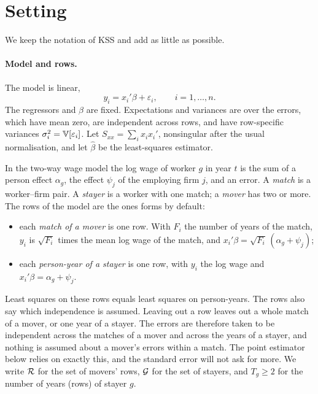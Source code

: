 \section{Setting}\label{sec:setting}

We keep the notation of KSS and add as little as possible.

\paragraph{Model and rows.} The model is linear,
\[
y_i = x_i'\beta + \varepsilon_i, \qquad i=1,\dots,n .
\]
The regressors and $\beta$ are fixed. Expectations and variances are over the errors, which have mean zero, are
independent across rows, and have row-specific variances $\sigma_i^2=\mathbb{V}[\varepsilon_i]$. Let
$S_{xx}=\sum_ix_ix_i'$, nonsingular after the usual normalisation, and let $\hat\beta$ be the least-squares
estimator.

In the two-way wage model the log wage of worker $g$ in year $t$ is the sum of a person effect $\alpha_g$, the
effect $\psi_j$ of the employing firm $j$, and an error. A \emph{match} is a worker--firm pair. A \emph{stayer}
is a worker with one match; a \emph{mover} has two or more. The rows of the model are the ones \fevc{} forms by
default:
\begin{itemize}
\item each \emph{match of a mover} is one row. With $F_i$ the number of years of the match, $y_i$ is $\sqrt{F_i}$
times the mean log wage of the match, and $x_i'\beta=\sqrt{F_i}\,(\alpha_g+\psi_j)$;
\item each \emph{person-year of a stayer} is one row, with $y_i$ the log wage and $x_i'\beta=\alpha_g+\psi_j$.
\end{itemize}
Least squares on these rows equals least squares on person-years. The rows also say which independence is
assumed. Leaving out a row leaves out a whole match of a mover, or one year of a stayer. The errors are
therefore taken to be independent across the matches of a mover and across the years of a stayer, and nothing
is assumed about a mover's errors within a match. The point estimator below relies on exactly this, and the
standard error will not ask for more. We write $\mathcal{R}$ for the set of movers' rows, $\mathcal{G}$ for the set of stayers,
and $T_g\ge2$ for the number of years (rows) of stayer $g$.

